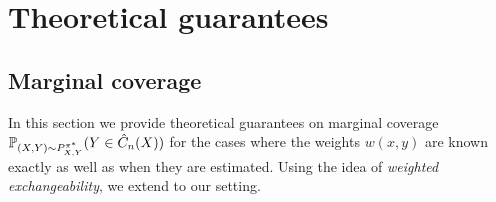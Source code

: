 

\section{Theoretical guarantees}\label{sec:theory}
\subsection{Marginal coverage}

In this section we provide theoretical guarantees on marginal coverage $\mathbb{P}_{(X,Y)\sim P^{\pi^*}_{X,Y}}(Y \in \hat{C}_n(X))$ for the cases where the weights $w(x, y)$ are known exactly as well as when they are estimated. Using the idea of \textit{weighted exchangeability}, we extend \cite[Theorem 2]{tibshirani2020conformal} to our setting. 

